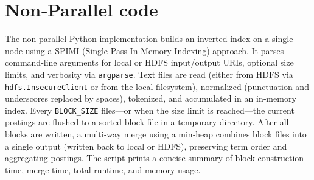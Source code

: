\section{Non‑Parallel code}
The non‑parallel Python implementation builds an inverted index on a single node using a SPIMI (Single Pass In‑Memory Indexing) approach. It parses command‑line arguments for local or HDFS input/output URIs, optional size limits, and verbosity via \texttt{argparse}. Text files are read (either from HDFS via \texttt{hdfs.InsecureClient} or from the local filesystem), normalized (punctuation and underscores replaced by spaces), tokenized, and accumulated in an in‑memory index. Every \texttt{BLOCK\_SIZE} files—or when the size limit is reached—the current postings are flushed to a sorted block file in a temporary directory.  
After all blocks are written, a multi‑way merge using a min‑heap combines block files into a single output (written back to local or HDFS), preserving term order and aggregating postings. The script prints a concise summary of block construction time, merge time, total runtime, and memory usage.  
